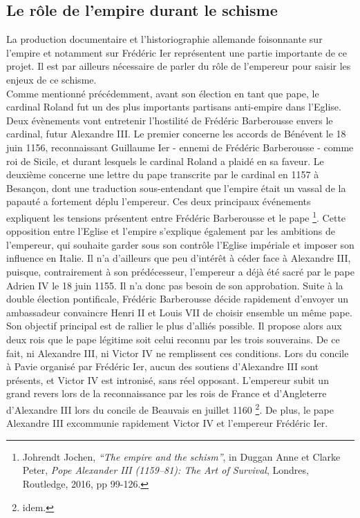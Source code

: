     \subsection{Le rôle de l'empire durant le schisme}

La production documentaire et l’historiographie allemande foisonnante sur l’empire et notamment sur Frédéric Ier représentent une partie importante de ce projet. Il est par ailleurs nécessaire de parler du rôle de l’empereur pour saisir les enjeux de ce schisme.\\
Comme mentionné précédemment, avant son élection en tant que pape, le cardinal Roland fut un des plus importants partisans anti-empire dans l’Eglise. Deux évènements vont entretenir l’hostilité de Frédéric Barberousse envers le cardinal, futur Alexandre III. Le premier concerne les accords de Bénévent le 18 juin 1156, reconnaissant Guillaume Ier - ennemi de Frédéric Barberousse - comme roi de Sicile, et durant lesquels le cardinal Roland a plaidé en sa faveur. Le deuxième concerne une lettre du pape transcrite par le cardinal en 1157 à Besançon, dont une traduction sous-entendant que l’empire était un vassal de la papauté a fortement déplu l’empereur. Ces deux principaux événements expliquent les tensions présentent entre Frédéric Barberousse et le pape \footnote{Johrendt Jochen, \textit{“The empire and the schism”}, in Duggan Anne et Clarke Peter, \textit{Pope Alexander III (1159–81): The Art of Survival}, Londres, Routledge, 2016, pp 99-126.}. Cette opposition entre l’Eglise et l’empire s’explique également par les ambitions de l’empereur, qui souhaite garder sous son contrôle l’Eglise impériale et imposer son influence en Italie. Il n’a d’ailleurs que peu d’intérêt à céder face à Alexandre III, puisque, contrairement à son prédécesseur, l’empereur a déjà été sacré par le pape Adrien IV le 18 juin 1155. Il n’a donc pas besoin de son approbation.
Suite à la double élection pontificale, Frédéric Barberousse décide rapidement d'envoyer un ambassadeur convaincre Henri II et Louis VII de choisir ensemble un même pape. Son objectif principal est de rallier le plus d’alliés possible. Il propose alors aux deux rois que le pape légitime soit celui reconnu par les trois souverains. De ce fait, ni Alexandre III, ni Victor IV ne remplissent ces conditions. Lors du concile à Pavie organisé par Frédéric Ier, aucun des soutiens d’Alexandre III sont présents, et Victor IV est intronisé, sans réel opposant. L’empereur subit un grand revers lors de la reconnaissance par les rois de France et d’Angleterre d’Alexandre III lors du concile de Beauvais en juillet 1160 \footnote{idem.}. De plus, le pape Alexandre III excommunie rapidement Victor IV et l’empereur Frédéric Ier.\\
